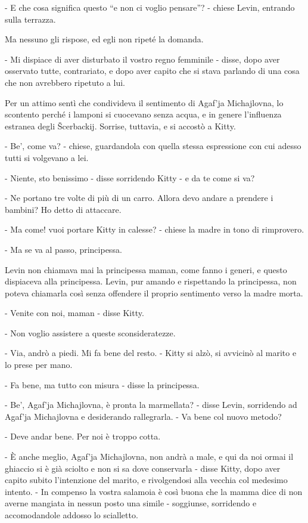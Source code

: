 - E che cosa significa questo ``e non ci voglio pensare''? - chiese Levin, entrando sulla terrazza. 

Ma nessuno gli rispose, ed egli non ripeté la domanda. 

- Mi dispiace di aver disturbato il vostro regno femminile - disse, dopo aver osservato tutte, contrariato, e dopo aver capito che si stava parlando di una cosa che non avrebbero ripetuto a lui. 

Per un attimo sentì che condivideva il sentimento di Agaf'ja Michajlovna, lo scontento perché i lamponi si cuocevano senza acqua, e in genere l'influenza estranea degli Šcerbackij. Sorrise, tuttavia, e si accostò a Kitty. 

- Be', come va? - chiese, guardandola con quella stessa espressione con cui adesso tutti si volgevano a lei. 

- Niente, sto benissimo - disse sorridendo Kitty - e da te come si va? 

- Ne portano tre volte di più di un carro. Allora devo andare a prendere i bambini? Ho detto di attaccare. 

- Ma come! vuoi portare Kitty in calesse? - chiese la madre in tono di rimprovero. 

- Ma se va al passo, principessa. 

Levin non chiamava mai la principessa maman, come fanno i generi, e questo dispiaceva alla principessa. Levin, pur amando e rispettando la principessa, non poteva chiamarla così senza offendere il proprio sentimento verso la madre morta. 

- Venite con noi, maman - disse Kitty. 

- Non voglio assistere a queste sconsideratezze. 

- Via, andrò a piedi. Mi fa bene del resto. - Kitty si alzò, si avvicinò al marito e lo prese per mano. 

- Fa bene, ma tutto con misura - disse la principessa. 

- Be', Agaf'ja Michajlovna, è pronta la marmellata? - disse Levin, sorridendo ad Agaf'ja Michajlovna e desiderando rallegrarla. - Va bene col nuovo metodo? 

- Deve andar bene. Per noi è troppo cotta. 

- È anche meglio, Agaf'ja Michajlovna, non andrà a male, e qui da noi ormai il ghiaccio si è già sciolto e non si sa dove conservarla - disse Kitty, dopo aver capito subito l'intenzione del marito, e rivolgendosi alla vecchia col medesimo intento. - In compenso la vostra salamoia è così buona che la mamma dice di non averne mangiata in nessun posto una simile - soggiunse, sorridendo e accomodandole addosso lo scialletto. 

